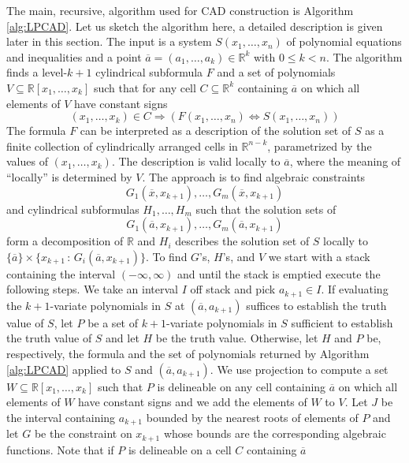 \documentclass[english]{amsart}
\numberwithin{equation}{section}
\numberwithin{figure}{section}
\begin{document}
The main, recursive, algorithm used for CAD construction is Algorithm
\ref{alg:LPCAD}. Let us sketch the algorithm here, a detailed description
is given later in this section. The input is\emph{ }a system $S(x_{1},\ldots,x_{n})$\emph{
}of polynomial equations and inequalities and a point $\overline{a}=(a_{1},\ldots,a_{k})\in\mathbb{R}^{k}$
with $0\leq k<n$. The algorithm finds a level-$k+1$ cylindrical
subformula $F$ and a set of polynomials \emph{$V\subseteq\mathbb{R}[x_{1},\ldots,x_{k}]$}
such that for any cell $C\subseteq\mathbb{R}^{k}$ containing $\overline{a}$
on which all elements of $V$ have constant signs\emph{ }\[
(x_{1},\ldots,x_{k})\in C\Rightarrow\left(F(x_{1},\ldots,x_{n})\Longleftrightarrow S(x_{1},\ldots,x_{n})\right)\]
The formula $F$ can be interpreted as a description of the solution
set of $S$ as a finite collection of cylindrically arranged cells
in $\mathbb{R}^{n-k}$, parametrized by the values of $(x_{1},\ldots,x_{k})$.
The description is valid locally to $\overline{a}$, where the meaning
of {}``locally'' is determined by $V$. The approach is to find
algebraic constraints \[
G_{1}(\overline{x},x_{k+1}),\ldots,G_{m}(\overline{x},x_{k+1})\]
 and cylindrical subformulas $H_{1},\ldots,H_{m}$ such that the solution
sets of \[
G_{1}(\overline{a},x_{k+1}),\ldots,G_{m}(\overline{a},x_{k+1})\]
form a decomposition of $\mathbb{R}$ and $H_{i}$ describes the solution
set of $S$ locally to $\{\overline{a}\}\times\{x_{k+1}\,:\, G_{i}(\overline{a},x_{k+1})\}$.
To find $G$'s, $H$'s, and $V$ we start with a stack containing
the interval $(-\infty,\infty)$ and until the stack is emptied execute
the following steps. We take an interval $I$ off stack and pick $a_{k+1}\in I$.
If evaluating the $k+1$-variate polynomials in $S$ at $(\overline{a},a_{k+1})$
suffices to establish the truth value of $S$, let $P$ be a set of
$k+1$-variate polynomials in $S$ sufficient to establish the truth
value of $S$ and let $H$ be the truth value. Otherwise, let $H$
and $P$ be, respectively, the formula and the set of polynomials
returned by Algorithm \ref{alg:LPCAD} applied to $S$ and $(\overline{a},a_{k+1})$.
We use projection to compute a set \emph{$W\subseteq\mathbb{R}[x_{1},\ldots,x_{k}]$}
such that $P$ is delineable on any cell containing $\overline{a}$
on which all elements of $W$ have constant signs and we add the elements
of $W$ to $V$. Let $J$ be the interval containing $a_{k+1}$ bounded
by the nearest roots of elements of $P$ and let $G$ be the constraint
on $x_{k+1}$ whose bounds are the corresponding algebraic functions.
Note that if $P$ is delineable on a cell $C$ containing $\overline{a}$
\end{document}
